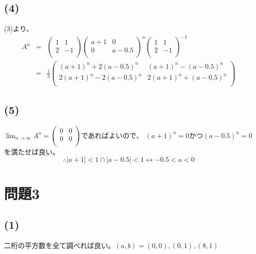 \documentclass[]{jsarticle}
\begin{document}
    \subsection*{(4)}
        (3)より、
            \begin{eqnarray}
                A^n &=& \begin{pmatrix}
                    1 & 1 \\
                    2 & -1 \\
                \end{pmatrix}\begin{pmatrix}
                    a + 1 & 0 \\
                    0 & a - 0.5 \\
                \end{pmatrix}^n\begin{pmatrix}
                    1 & 1 \\
                    2 & -1 \\
                \end{pmatrix}^{-1} \nonumber \\
                &=& \frac{1}{3}\begin{pmatrix}
                    (a + 1)^n + 2(a - 0.5)^n & (a + 1)^n - (a - 0.5)^n \\
                    2(a + 1)^n - 2(a - 0.5)^n & 2(a + 1)^n + (a - 0.5)^n \\
                \end{pmatrix} \nonumber
            \end{eqnarray}
    \subsection*{(5)}
        $\displaystyle\lim_{n\rightarrow\infty}A^n = \begin{pmatrix}
            0 & 0 \\
            0 & 0 \\
        \end{pmatrix}$であればよいので、
        $(a + 1)^n = 0$かつ$(a - 0.5)^n = 0$
        を満たせば良い。
        \begin{equation*}
            \therefore |a + 1| < 1 \cap |a - 0.5| < 1 \leftrightarrow -0.5 < a < 0
        \end{equation*}
\section*{問題3}
    \subsection*{(1)}
        二桁の平方数を全て調べれば良い。$(a, b) = (0, 0), (0, 1), (8, 1)$
\end{document}
